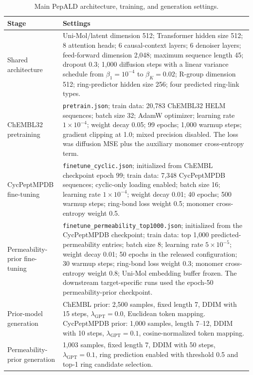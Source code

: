 \documentclass[12pt]{article}
\begin{document}
\begin{table}[htbp]
\centering
\small
\caption{Main PepALD architecture, training, and generation settings.}
\label{tab:sup_training}
\begin{tabular}{L{0.25\textwidth}L{0.66\textwidth}}
\toprule
Stage & Settings \\
\midrule
Shared architecture & Uni-Mol/latent dimension 512; Transformer hidden size 512; 8 attention heads; 6 causal-context layers; 6 denoiser layers; feed-forward dimension 2,048; maximum sequence length 45; dropout 0.3; 1,000 diffusion steps with a linear variance schedule from \(\beta_1=10^{-4}\) to \(\beta_K=0.02\); R-group dimension 512; ring-predictor hidden size 256; four predicted ring-link types. \\
ChEMBL32 pretraining & \texttt{pretrain.json}; train data: 20,783 ChEMBL32 HELM sequences; batch size 32; AdamW optimizer; learning rate \(1\times10^{-4}\); weight decay 0.05; 99 epochs; 1,000 warmup steps; gradient clipping at 1.0; mixed precision disabled. The loss was diffusion MSE plus the auxiliary monomer cross-entropy term. \\
CycPeptMPDB fine-tuning & \texttt{finetune\_cyclic.json}; initialized from ChEMBL checkpoint epoch 99; train data: 7,348 CycPeptMPDB sequences; cyclic-only loading enabled; batch size 16; learning rate \(1\times10^{-4}\); weight decay 0.01; 40 epochs; 500 warmup steps; ring-bond loss weight 0.5; monomer cross-entropy weight 0.5. \\
Permeability-prior fine-tuning & \texttt{finetune\_permeability\_top1000.json}; initialized from the CycPeptMPDB checkpoint; train data: top 1,000 predicted-permeability entries; batch size 8; learning rate \(5\times10^{-5}\); weight decay 0.01; 50 epochs in the released configuration; 30 warmup steps; ring-bond loss weight 0.3; monomer cross-entropy weight 0.8; Uni-Mol embedding buffer frozen. The downstream target-specific runs used the epoch-50 permeability-prior checkpoint. \\
Prior-model generation & ChEMBL prior: 2,500 samples, fixed length 7, DDIM with 15 steps, \(\lambda_{\mathrm{GPT}}=0.0\), Euclidean token mapping. CycPeptMPDB prior: 1,000 samples, length 7--12, DDIM with 10 steps, \(\lambda_{\mathrm{GPT}}=0.1\), cosine-normalized token mapping. \\
Permeability-prior generation & 1,003 samples, fixed length 7, DDIM with 50 steps, \(\lambda_{\mathrm{GPT}}=0.1\), ring prediction enabled with threshold 0.5 and top-1 ring candidate selection. \\
\bottomrule
\end{tabular}
\end{table}
\FloatBarrier
\end{document}
